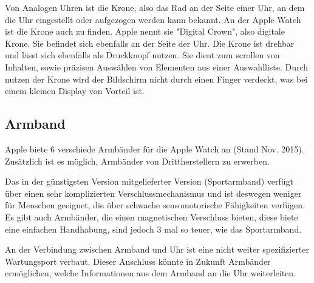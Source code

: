 Von Analogen Uhren ist die Krone, also das Rad an der Seite einer Uhr, an dem die Uhr eingestellt oder aufgezogen werden kann bekannt. An der Apple Watch ist die Krone auch zu finden. Apple nennt sie "Digital Crown", also digitale Krone. Sie befindet sich ebenfalls an der Seite der Uhr. Die Krone ist drehbar und lässt sich ebenfalls als Druckknopf nutzen. Sie dient zum scrollen von Inhalten, sowie präzisen Auswählen von Elementen aus einer Auswahlliste. Durch nutzen der Krone wird der Bildschirm nicht durch einen Finger verdeckt, was bei einem kleinen Display von Vorteil ist.

\subsection{Armband}
Apple biete 6 verschiede Armbänder für die Apple Watch an (Stand Nov. 2015). Zusätzlich ist es möglich, Armbänder von Drittherstellern zu erwerben. 

Das in der günstigsten Version mitgelieferter Version (Sportarmband) verfügt über einen sehr komplizierten Verschlussmechanismus und ist deswegen weniger für Menschen geeignet, die über schwache sensomotorische Fähigkeiten verfügen. Es gibt auch Armbänder, die einen magnetischen Verschluss bieten, diese biete eine einfachen Handhabung, sind jedoch 3 mal so teuer, wie das Sportarmband.

An der Verbindung zwischen Armband und Uhr ist eine nicht weiter spezifizierter Wartungsport verbaut. Dieser Anschluss könnte in Zukunft Armbänder ermöglichen, welche Informationen aus dem Armband an die Uhr weiterleiten.


